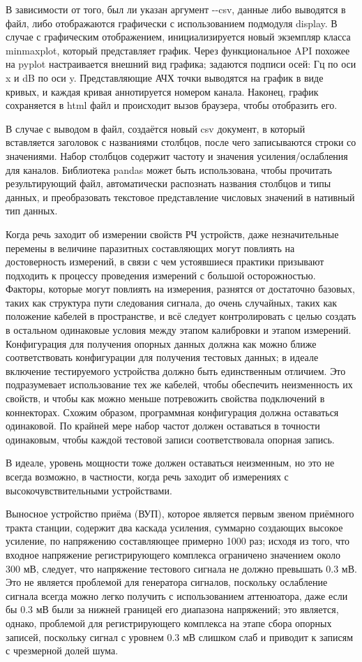 \documentclass{report}
\begin{document}
В зависимости от того, был ли указан аргумент -{}-csv, данные либо выводятся в файл, либо отображаются графически с использованием подмодуля display. В случае с графическим отображением, инициализируется новый экземпляр класса minmaxplot, который представляет график. Через функциональное API похожее на pyplot настраивается внешний вид графика; задаются подписи осей: Гц по оси x и dB по оси y. Представляющие АЧХ точки выводятся на график в виде кривых, и каждая кривая аннотируется номером канала. Наконец, график сохраняется в html файл и происходит вызов браузера, чтобы отобразить его.

В случае с выводом в файл, создаётся новый csv документ, в который вставляется заголовок с названиями столбцов, после чего записываются строки со значениями. Набор столбцов содержит частоту и значения усиления/ослабления для каналов. Библиотека pandas может быть использована, чтобы прочитать результирующий файл, автоматически распознать названия столбцов и типы данных, и преобразовать текстовое представление числовых значений в нативный тип данных.

Когда речь заходит об измерении свойств РЧ устройств, даже незначительные перемены в величине паразитных составляющих могут повлиять на достоверность измерений, в связи с чем устоявшиеся практики призывают подходить к процессу проведения измерений с большой осторожностью. Факторы, которые могут повлиять на измерения, разнятся от достаточно базовых, таких как структура пути следования сигнала, до очень случайных, таких как положение кабелей в пространстве, и всё следует контролировать с целью создать в остальном одинаковые условия между этапом калибровки и этапом измерений. Конфигурация для получения опорных данных должна как можно ближе соответствовать конфигурации для получения тестовых данных; в идеале включение тестируемого устройства должно быть единственным отличием. Это подразумевает использование тех же кабелей, чтобы обеспечить неизменность их свойств, и чтобы как можно меньше потревожить свойства подключений в коннекторах. Схожим образом, программная конфигурация должна оставаться одинаковой. По крайней мере набор частот должен оставаться в точности одинаковым, чтобы каждой тестовой записи соответствовала опорная запись.

В идеале, уровень мощности тоже должен оставаться неизменным, но это не всегда возможно, в частности, когда речь заходит об измерениях с высокочувствительными устройствами.

Выносное устройство приёма (ВУП), которое является первым звеном приёмного тракта станции, содержит два каскада усиления, суммарно создающих высокое усиление, по напряжению составляющее примерно 1000 раз; исходя из того, что входное напряжение регистрирующего комплекса ограничено значением около 300 мВ, следует, что напряжение тестового сигнала не должно превышать 0.3 мВ. Это не является проблемой для генератора сигналов, поскольку ослабление сигнала всегда можно легко получить с использованием аттенюатора, даже если бы 0.3 мВ были за нижней границей его диапазона напряжений; это является, однако, проблемой для регистрирующего комплекса на этапе сбора опорных записей, поскольку сигнал с уровнем 0.3 мВ слишком слаб и приводит к записям с чрезмерной долей шума.
\end{document}
